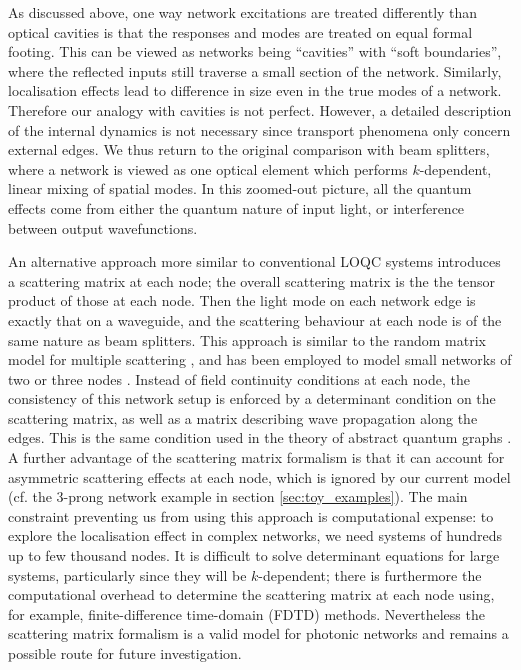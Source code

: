 As discussed above, one way network excitations are treated differently than optical cavities is that the responses and modes are treated on equal formal footing. This can be viewed as networks being ``cavities'' with ``soft boundaries'', where the reflected inputs still traverse a small section of the network. Similarly, localisation effects lead to difference in size even in the true modes of a network. Therefore our analogy with cavities is not perfect. However, a detailed description of the internal dynamics is not necessary since transport phenomena only concern external edges. We thus return to the original comparison with beam splitters, where a network is viewed as one optical element which performs $k$-dependent, linear mixing of spatial modes. In this zoomed-out picture, all the quantum effects come from either the quantum nature of input light, or interference between output wavefunctions. 

An alternative approach more similar to conventional LOQC systems introduces a scattering matrix at each node; the overall scattering matrix is the the tensor product of those at each node. Then the light mode on each network edge is exactly that on a waveguide, and the scattering behaviour at each node is of the same nature as beam splitters. This approach is similar to the random matrix model for multiple scattering \cite{Rotter2017}, and has been employed to model small networks of two or three nodes \cite{Lepri2017}. Instead of field continuity conditions at each node, the consistency of this network setup is enforced by a determinant condition on the scattering matrix, as well as a matrix describing wave propagation along the edges. This is the same condition used in the theory of abstract quantum graphs \cite{Gnutzmann2006}. A further advantage of the scattering matrix formalism is that it can account for asymmetric scattering effects at each node, which is ignored by our current model (cf. the 3-prong network example in section \ref{sec:toy_examples}). The main constraint preventing us from using this approach is computational expense: to explore the localisation effect in complex networks, we need systems of hundreds up to few thousand nodes. It is difficult to solve determinant equations for large systems, particularly since they will be $k$-dependent; there is furthermore the computational overhead to determine the scattering matrix at each node using, for example, finite-difference time-domain (FDTD) methods. Nevertheless the scattering matrix formalism is a valid model for photonic networks and remains a possible route for future investigation.
